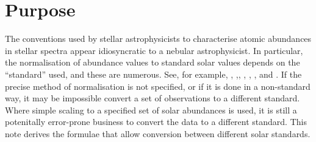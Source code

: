 \section{Purpose}

The conventions used by stellar astrophysicists to characterise atomic abundances in stellar spectra appear idiosyncratic to a nebular astrophysicist.  In particular, the normalisation of abundance values to standard solar values depends on the ``standard'' used, and these are numerous. See, for example, \cite{1989GeCoA..53..197A}, \cite{1998SSRv...85..161G},\cite{2007SSRv..130..105G}, \cite{2009ARA&A..47..481A}, \cite{2010Ap&SS.328..179G}, \cite{2015A&A...573A..25S}, \cite{2015A&A...573A..26S} and \cite{2015A&A...573A..27G}.  If the precise method of normalisation is not specified, or if it is done in a non-standard way, it may be impossible convert a set of observations to a different standard. Where simple scaling to a specified set of solar abundances is used, it is still a potenitally error-prone business to convert the data to a different standard. This note derives the formulae that allow conversion between different solar standards.
  
  
  
  
  